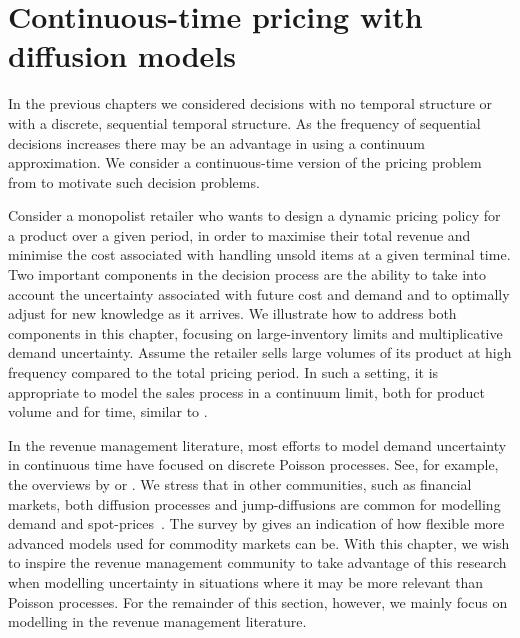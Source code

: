 \documentclass[main.tex]{subfiles}
\begin{document}
\chapter{Continuous-time pricing with diffusion
  models}\label{ch:cts_control}

In the previous chapters we considered decisions with no temporal
structure or with a discrete, sequential temporal structure.
As the frequency of sequential decisions increases there may be an
advantage in using a continuum approximation.
We consider a continuous-time version of the pricing problem from
 to motivate such decision problems.

Consider a monopolist retailer who wants to design a dynamic pricing policy
for a product over a given period, in order to maximise their total
revenue and minimise the cost associated with handling unsold items
at a given terminal time.
Two important components in the decision process are the ability to
take into account the uncertainty associated with future cost and demand and to
optimally adjust for new knowledge as it arrives.
We illustrate how to address both components in this chapter,
focusing on large-inventory limits and multiplicative demand
uncertainty.
Assume the retailer sells large volumes of its product at
high frequency compared to the total pricing period. In such a setting, it is
appropriate to model the sales process in a continuum limit, both for
product volume and for time, similar to \citet{kalish1983monopolist}.

In the revenue management literature, most efforts to model demand uncertainty in
continuous time have focused on discrete Poisson
processes. See, for example, the overviews by \citet{bitran2003overview}
or \citet{aviv2012dynamic}.
We stress that in other communities, such as financial markets,
both diffusion processes and jump-diffusions are common for modelling
demand and spot-prices~\citep{benth2014stochastic}. The survey by \citet{carmona2014survey}
gives an indication of how flexible more advanced models used for commodity
markets can be. With this chapter, we wish to inspire the revenue
management community to take advantage of this research when modelling
uncertainty in situations where it may be more relevant than Poisson
processes. For the remainder of this section,
however, we mainly focus on modelling in the revenue management literature.
\end{document}
